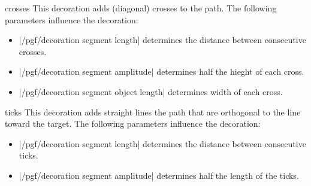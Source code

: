 \begin{decoration}{crosses}
	This decoration adds (diagonal) crosses to the path. The following
  parameters influence the decoration:  
  \begin{itemize}
  \item |/pgf/decoration segment length|
    determines the distance between consecutive crosses.
  \item |/pgf/decoration segment amplitude|
    determines half the hieght of each cross.
  \item |/pgf/decoration segment object length|
    determines width of each cross.
  \end{itemize}
\begin{codeexample}[]
\end{codeexample}
\end{decoration}

\begin{decoration}{ticks}
  This decoration adds straight lines  the path that are orthogonal to 
  the line toward the target. The following parameters influence the 
  decoration: 
  \begin{itemize}
  \item |/pgf/decoration segment length|
    determines the distance between consecutive ticks.
  \item |/pgf/decoration segment amplitude|
    determines half the length of the ticks.
  \end{itemize}
\begin{codeexample}[]
\end{codeexample}
\end{decoration}

